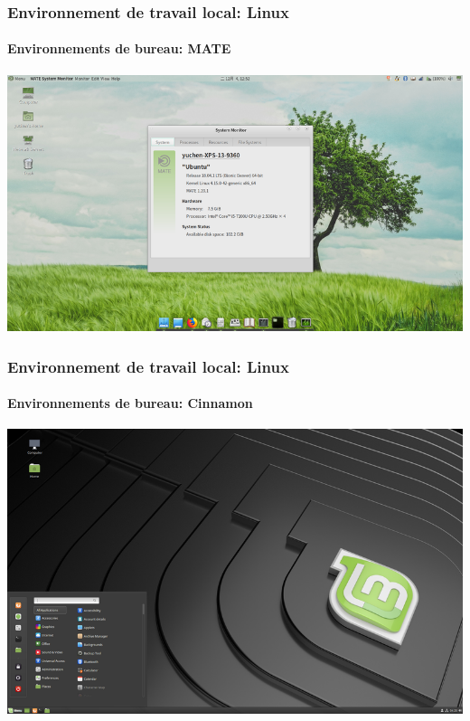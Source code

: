 \documentclass[xcolor=table]{beamer}
\begin{document}
\begin{frame}
\frametitle{Environnement de travail local: Linux}
\framesubtitle{Environnements de bureau: MATE}

\begin{center}
	\includegraphics[height=
.8\textheight]{../img/Bweb01-environnement/mate.png}
\end{center}

\end{frame}


\begin{frame}
\frametitle{Environnement de travail local: Linux}
\framesubtitle{Environnements de bureau: Cinnamon}

\begin{center}
	\includegraphics[height=
.8\textheight]{../img/Bweb01-environnement/cinnamon.png}
\end{center}

\end{frame}
\end{document}
